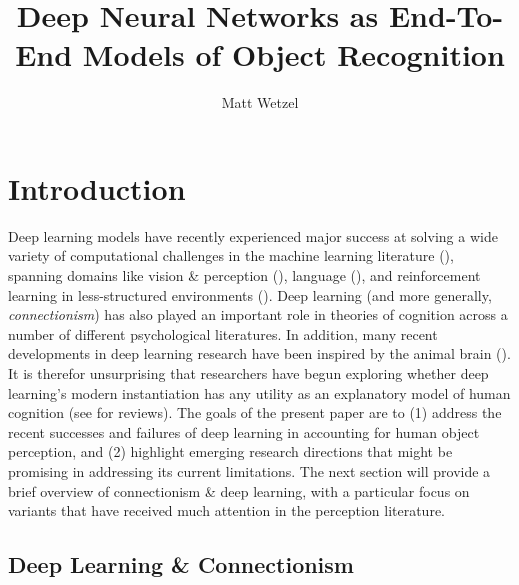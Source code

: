 \documentclass[12pt]{article}
\title{Deep Neural Networks as End-To-End Models of Object Recognition}
\author{Matt Wetzel}
\let\oldcite=\cite
\renewcommand{\cite}[1]{\textcolor[rgb]{0, .121, .388}{\oldcite{#1}}}
\begin{document}
%
%
\maketitle
\pagebreak

\tableofcontents
\pagebreak









%
%

\section{Introduction}


Deep learning models have recently experienced major success at solving a wide variety of computational challenges in the machine learning literature (\cite{lecun2015deep,he2015delving}), spanning domains like vision \& perception (\cite{lecun1995convolutional}), language (\cite{hochreiter1997long}), and reinforcement learning in less-structured environments (\cite{mnih2013playing}). Deep learning (and more generally, \emph{connectionism}) has also played an important role in theories of cognition across a number of different psychological literatures. In addition, many recent developments in deep learning research have been inspired by the animal brain (\cite{lecun2015deep,sabour2017dynamic,graves2014neural,jarrett2009best}). It is therefor unsurprising that researchers have begun exploring whether deep learning's modern instantiation has any utility as an explanatory model of human cognition (see \cite{yamins2016using,serre2019deep,storrs2019deep} for reviews). The goals of the present paper are to (1) address the recent successes and failures of deep learning in accounting for human object perception, and (2) highlight emerging research directions that might be promising in addressing its current limitations. The next section will provide a brief overview of connectionism \& deep learning, with a particular focus on variants that have received much attention in the perception literature.

\subsection{Deep Learning \& Connectionism}
\end{document}
